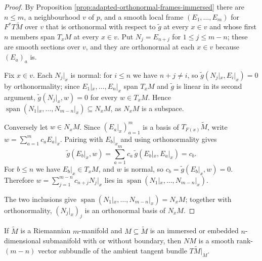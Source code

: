 \begin{proof}
\leanok
{}
By Proposition \ref{prop:adapted-orthonormal-frames-immersed} there are $n \le m$, a
neighbourhood $v$ of $p$, and a smooth local frame $(E_1, \ldots, E_m)$ for $F^*T\tilde M$ over
$v$ that is orthonormal with respect to $\tilde g$ at every $x \in v$ and whose first $n$ members
span $T_x M$ at every $x \in v$. Put $N_j = E_{n+j}$ for $1 \le j \le m-n$; these are smooth
sections over $v$, and they are orthonormal at each $x \in v$ because $(E_a)_a$ is.

Fix $x \in v$. Each $N_j|_x$ is normal: for $i \le n$ we have $n + j \ne i$, so
$\tilde g(N_j|_x, E_i|_x) = 0$ by orthonormality; since $E_1|_x, \ldots, E_n|_x$ span $T_x M$ and
$\tilde g$ is linear in its second argument, $\tilde g(N_j|_x, w) = 0$ for every $w \in T_x M$.
Hence $\operatorname{span}(N_1|_x, \ldots, N_{m-n}|_x) \subseteq N_x M$, as $N_x M$ is a subspace.

Conversely let $w \in N_x M$. Since $(E_a|_x)_{a=1}^m$ is a basis of $T_{F(x)}\tilde M$, write
$w = \sum_{a=1}^m c_a E_a|_x$. Pairing with $E_b|_x$ and using orthonormality gives
\[
  \tilde g(E_b|_x, w) = \sum_{a=1}^m c_a \, \tilde g(E_b|_x, E_a|_x) = c_b .
\]
For $b \le n$ we have $E_b|_x \in T_x M$, and $w$ is normal, so $c_b = \tilde g(E_b|_x, w) = 0$.
Therefore $w = \sum_{j=1}^{m-n} c_{n+j} N_j|_x$ lies in
$\operatorname{span}(N_1|_x, \ldots, N_{m-n}|_x)$.

The two inclusions give $\operatorname{span}(N_1|_x, \ldots, N_{m-n}|_x) = N_x M$; together with
orthonormality, $(N_j|_x)_j$ is an orthonormal basis of $N_x M$.
\end{proof}

\begin{proposition}
\label{prop:normal-bundle}
\leanok
{}
If $\tilde{M}$ is a Riemannian $m$-manifold and $M \subseteq \tilde{M}$ is an immersed or embedded $n$-dimensional submanifold with or without boundary, then $NM$ is a smooth rank-$(m-n)$ vector subbundle of the ambient tangent bundle $T\tilde{M}|_M$.
\end{proposition}

